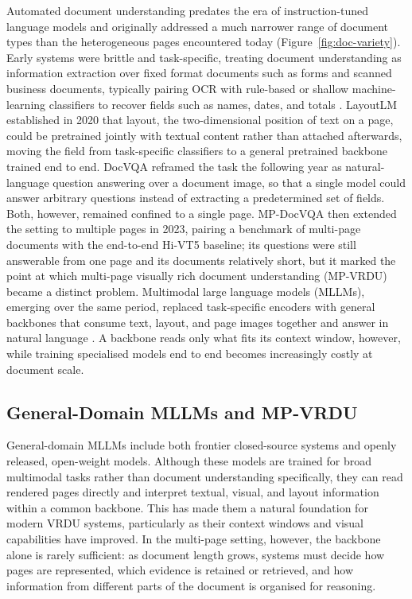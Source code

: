 \documentclass[11pt,twoside,openany]{report}
\begin{document}
Automated document understanding predates the era of instruction-tuned language models and originally addressed a much narrower range of document types than the heterogeneous pages encountered today (Figure~\ref{fig:doc-variety}). Early systems were brittle and task-specific, treating document understanding as information extraction over fixed format documents such as forms and scanned business documents, typically pairing OCR with rule-based or shallow machine-learning classifiers to recover fields such as names, dates, and totals \citep{subramani2020survey, jaume2019funsd}. LayoutLM \citep{xu2020layoutlm} established in 2020 that layout, the two-dimensional position of text on a page, could be pretrained jointly with textual content rather than attached afterwards, moving the field from task-specific classifiers to a general pretrained backbone trained end to end. DocVQA \citep{mathew2021docvqa} reframed the task the following year as natural-language question answering over a document image, so that a single model could answer arbitrary questions instead of extracting a predetermined set of fields. Both, however, remained confined to a single page. MP-DocVQA \citep{tito2023hierarchical} then extended the setting to multiple pages in 2023, pairing a benchmark of multi-page documents with the end-to-end Hi-VT5 baseline; its questions were still answerable from one page and its documents relatively short, but it marked the point at which multi-page visually rich document understanding (MP-VRDU) became a distinct problem. Multimodal large language models (MLLMs), emerging over the same period, replaced task-specific encoders with general backbones that consume text, layout, and page images together and answer in natural language \citep{ye2023ureader, hu2024mplug}. A backbone reads only what fits its context window, however, while training specialised models end to end becomes increasingly costly at document scale.

\subsection{General-Domain MLLMs and MP-VRDU}
\label{sec:bg-designspace}

General-domain MLLMs include both frontier closed-source systems and openly released, open-weight models. Although these models are trained for broad multimodal tasks rather than document understanding specifically, they can read rendered pages directly and interpret textual, visual, and layout information within a common backbone. This has made them a natural foundation for modern VRDU systems, particularly as their context windows and visual capabilities have improved. In the multi-page setting, however, the backbone alone is rarely sufficient: as document length grows, systems must decide how pages are represented, which evidence is retained or retrieved, and how information from different parts of the document is organised for reasoning.
\end{document}
